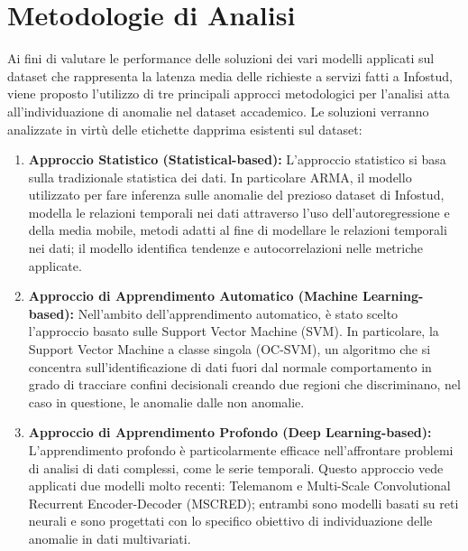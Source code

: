     
\chapter{Metodologie di Analisi}
    Ai fini di valutare le performance delle soluzioni dei vari modelli applicati sul dataset che rappresenta la latenza media 
    delle richieste a servizi fatti a Infostud, viene proposto l'utilizzo di tre principali approcci metodologici per 
    l'analisi atta all'individuazione di anomalie nel dataset accademico. Le soluzioni verranno analizzate 
    in virtù delle etichette dapprima esistenti sul dataset:
    \begin{enumerate}
        \item \textbf{Approccio Statistico (Statistical-based):} L'approccio statistico si basa sulla tradizionale 
              statistica dei dati. In particolare ARMA\cite{arma}, il modello utilizzato per fare inferenza sulle anomalie 
              del prezioso dataset di Infostud, modella le relazioni temporali nei dati attraverso l'uso dell'autoregressione 
              e della media mobile, metodi adatti al fine di modellare le relazioni temporali nei dati; il modello 
              identifica tendenze e autocorrelazioni nelle metriche applicate.
        \item \textbf{Approccio di Apprendimento Automatico (Machine Learning-based):} Nell'ambito dell'apprendimento automatico, 
              è stato scelto l'approccio basato sulle Support Vector Machine (SVM). In particolare, la Support Vector 
              Machine a classe singola (OC-SVM\cite{ocsvm}), un algoritmo che si concentra sull'identificazione di 
              dati fuori dal normale comportamento in grado di tracciare confini decisionali creando due regioni che 
              discriminano, nel caso in questione, le anomalie dalle non anomalie.
        \item \textbf{Approccio di Apprendimento Profondo (Deep Learning-based):} L'apprendimento profondo è particolarmente 
              efficace nell'affrontare problemi di analisi di dati complessi, come le serie temporali.  
              Questo approccio vede applicati due modelli molto recenti: Telemanom\cite{telemanom} e Multi-Scale Convolutional 
              Recurrent Encoder-Decoder (MSCRED\cite{mscred}); entrambi sono modelli basati su reti neurali e sono 
              progettati con lo specifico obiettivo di individuazione delle anomalie in dati multivariati. 
    \end{enumerate}

